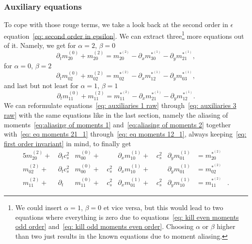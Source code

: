 \subsubsection{Auxiliary equations}
\label{subs:Auxiliary equations}
To cope with those rouge terms, we take a look back at the second order in $\epsilon$ equation~\eqref{eq: second order in epsilon}.
We can extract three\footnote{We could insert $\alpha=1$, $\beta=0$ et vice versa, but this would lead to two equations where everything is zero due to equations~\eqref{eq: kill even moments odd order} and~\eqref{eq: kill odd moments even order}.
Choosing $\alpha$ or $\beta$ higher than two just results in the known equations due to moment aliasing.} more equations out of it.
Namely, we get for $\alpha=2$, $\beta=0$
\begin{equation}
  \label{eq: auxiliaries 1 raw}
  \partial_t m_{20}^{(0)} + m_{20}^{(2)} =  m_{20}^{*^{(2)}} - \partial_x m_{30}^{*^{(1)}} - \partial_y m_{21}^{*^{(1)}},
\end{equation}
for $\alpha=0$, $\beta=2$
\begin{equation}
  \label{eq: auxiliaries 2 raw}
  \partial_t m_{02}^{(0)} + m_{02}^{(2)} =  m_{02}^{*^{(2)}} - \partial_x m_{12}^{*^{(1)}} - \partial_y m_{03}^{*^{(1)}},
\end{equation}
and last but not least for $\alpha=1$, $\beta=1$
\begin{equation}
  \label{eq: auxiliaries 3 raw}
  \partial_t m_{11}^{(0)} + m_{11}^{(2)} =  m_{11}^{*^{(2)}} - \partial_x m_{21}^{*^{(1)}} - \partial_y m_{12}^{*^{(1)}}.
\end{equation}
We can reformulate equations~\eqref{eq: auxiliaries 1 raw} through~\eqref{eq: auxiliaries 3 raw} with the same equations like in the last section, namely the aliasing of moments~\eqref{eq:aliasing of moments 1}
and~\eqref{eq:aliasing of moments 2} together with~\eqref{eq: eq moments 21_1}
through~\eqref{eq: eq moments 12_1}, always keeping~\eqref{eq: first order invariant} in mind, to finally get
\begin{alignat}{5}
  \label{eq: auxiliaries 1}
  m_{20}^{(2)} +&\, \partial_t c_s^2& m_{00}^{(0)} +&\, &\partial_x m_{10}^{(1)} +&\, c_s^2&\partial_y m_{01}^{(1)} &=  m_{20}^{*^{(2)}}&
  \\
  \label{eq: auxiliaries 2}
  m_{02}^{(2)} +&\, \partial_t c_s^2& m_{00}^{(0)} +&\, c_s^2&\partial_x m_{10}^{(1)} +&\, &\partial_y m_{01}^{(1)} &=  m_{02}^{*^{(2)}}&
  \\
  \label{eq: auxiliaries 3}
  m_{11}^{(2)} +&\, \partial_t &m_{11}^{(0)} +&\, c_s^2&\partial_x m_{01}^{(1)} +&\, c_s^2&\partial_y m_{10}^{(1)} &=  m_{11}^{*^{(2)}}&.
\end{alignat}
